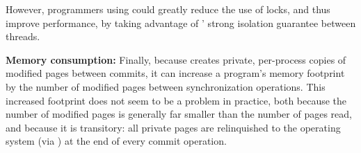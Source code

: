 However, programmers using \dthreads{} could greatly reduce the use of
locks, and thus improve performance, by taking advantage
of \dthreads{}' strong isolation guarantee between threads.




\textbf{Memory consumption: }
Finally, because \dthreads{} creates private, per-process copies of
modified pages between commits, it can increase a program's memory
footprint by the number of modified pages between synchronization
operations. This increased footprint does not seem to be a problem in
practice, both because the number of modified pages is generally far
smaller than the number of pages read, and because it is transitory:
all private pages are relinquished to the operating system
(via \munmap{}) at the end of every commit operation.



